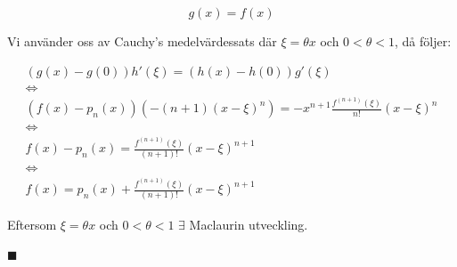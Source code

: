 \documentclass{article}
\begin{document}
\begin{equation}
    g(x) = f(x)
\end{equation}

\noindent Vi använder oss av Cauchy's medelvärdessats där $\xi = \theta x$ och $0 < \theta < 1$, då följer:

\begin{equation}
\begin{gathered}
    (g(x)-g(0))h'(\xi)
    =
    (h(x)-h(0))g'(\xi)\\
    \Leftrightarrow\\
    (f(x)-p_n(x))(-(n+1)(x-\xi)^n)
    =
    -x^{n+1}\frac{f^{(n+1)}(\xi)}{n!}(x-\xi)^n\\
    \Leftrightarrow\\
    f(x)-p_n(x)
    =
    \frac{f^{(n+1)}(\xi)}{(n+1)!}(x-\xi)^{n+1}\\
    \Leftrightarrow\\
    f(x)
    =
    p_n(x) + \frac{f^{(n+1)}(\xi)}{(n+1)!}(x-\xi)^{n+1}
\end{gathered}
\end{equation}

Eftersom $\xi = \theta x$ och $0<\theta<1$ $\exists$ Maclaurin utveckling. 

\begin{flushright}
    $\blacksquare$
\end{flushright}
\end{document}
